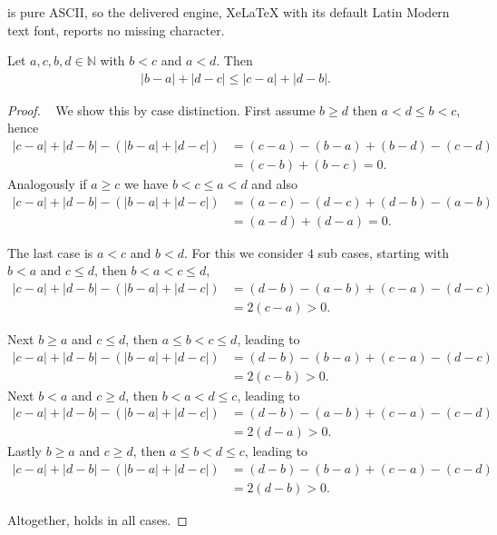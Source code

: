 \documentclass[10pt,a4paper]{amsart}
\begin{document}
is pure ASCII, so the delivered engine, XeLaTeX with its default Latin Modern text font, reports no missing character.
\begin{lemma}\label{lem:helperequations} %
Let $a,c,b,d \in \mathbb{N}$ with  $b < c$ and $a < d$. Then
\begin{align}
        |b-a| + |d-c| \leq |c-a| + |d-b| . \label{eq:helperequation}
\end{align}

\end{lemma}

\begin{proof} ~
We show this by case distinction. First assume $b \geq d$ then $a < d  \leq b < c$, hence
\begin{align*}
    |c-a| + |d-b| - (|b-a| + |d-c|) &= (c-a) - (b-a) + (b-d) - (c-d) \\
    &= (c-b) + (b-c)= 0.
\end{align*}
Analogously if  $a \geq c$ we have $b < c \leq a < d$ and also
\begin{align*}
    |c-a| + |d-b| - (|b-a| + |d-c|) &= (a-c) - (d-c) + (d-b) - (a-b) \\
    &= (a-d) + (d-a) = 0.
\end{align*}

The last case is $a < c$ and $b < d$. For this we consider $4$ sub cases, starting with $b < a$ and $c\leq d$, then $b< a < c\leq d$,
\begin{align*}
    |c-a| + |d-b| - (|b-a| + |d-c|) &=  (d-b)-(a-b) +  (c-a)  - (d-c) \\
    &= 2(c-a) > 0.
\end{align*}

Next $b \geq a$ and $c\leq d$, then $a \leq b < c \leq d$, leading to
\begin{align*}
    |c-a| + |d-b| - (|b-a| + |d-c|) &=  (d-b)-(b-a) +  (c-a)  - (d-c) \\
    &= 2(c-b) > 0.
\end{align*}
Next $b < a$ and $c\geq d$, then $b < a < d \leq c$, leading to
\begin{align*}
    |c-a| + |d-b| - (|b-a| + |d-c|) &=  (d-b)-(a-b) +  (c-a)  - (c-d) \\
    &= 2(d-a) > 0.
\end{align*}
Lastly $b \geq a$ and $c\geq d$, then $a \leq b < d \leq c$, leading to
\begin{align*}
    |c-a| + |d-b| - (|b-a| + |d-c|) &=  (d-b)-(b-a) +  (c-a)  - (c-d) \\
    &= 2(d-b) > 0.
\end{align*}

Altogether,  holds in all cases.
\end{proof}
\end{document}
